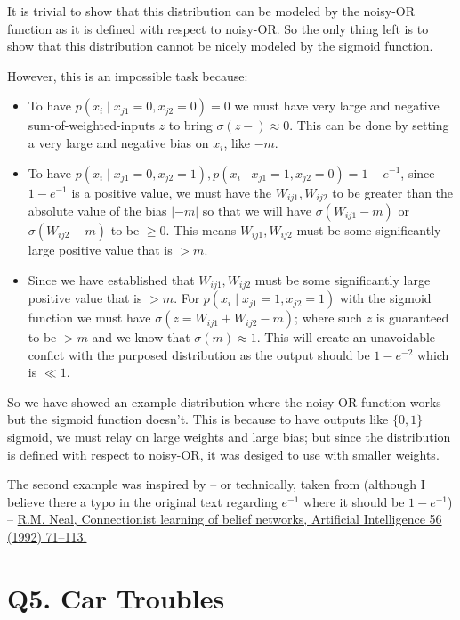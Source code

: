\documentclass[11pt]{article}
\begin{document}
It is trivial to show that this distribution can be modeled by the noisy-OR function as it is defined with respect to noisy-OR. So the only thing left is to show that this distribution cannot be nicely modeled by the sigmoid function.

However, this is an impossible task because:

\begin{itemize}
    \item To have $p(x_i  \mid x_{j1} = 0, x_{j2} = 0) = 0$ we must have very large and negative sum-of-weighted-inputs $z$ to bring $\sigma(z - \text{}) \approx 0$. This can be done by setting a very large and negative bias on $x_i$, like $-m$.
    \item To have $p(x_i \mid x_{j1} = 0, x_{j2} = 1), p(x_i  \mid x_{j1} = 1, x_{j2} = 0) = 1-e^{-1}$, since $1-e^{-1}$ is a positive value, we must have the $W_{ij1}, W_{ij2}$ to be greater than the absolute value of the bias $|-m|$ so that we will have $\sigma(W_{ij1} - m)$ or $\sigma(W_{ij2} - m)$ to be $\geq 0$. This means $W_{ij1}, W_{ij2}$ must be some significantly large positive value that is $> m$.
    \item Since we have established that $W_{ij1}, W_{ij2}$ must be some significantly large positive value that is $> m$. For $p(x_i \mid x_{j1} = 1, x_{j2} = 1)$ with the sigmoid function we must have $\sigma(z = W_{ij1} + W_{ij2} - m)$; where such $z$ is guaranteed to be $>m$ and we know that $\sigma(m) \approx 1$. This will create an unavoidable confict with the purposed distribution as the output should be $1-e^{-2}$ which is $\ll 1$.
\end{itemize}

So we have showed an example distribution where the noisy-OR function works but the sigmoid function doesn't. This is because to have outputs like $\{0, 1\}$ sigmoid, we must relay on large weights and large bias; but since the distribution is defined with respect to noisy-OR, it was desiged to use with smaller weights.\newline


\noindent The second example was inspired by -- or technically, taken from (although I believe there a typo in the original text regarding $e^{-1}$ where it should be $1 - e^{-1}$) -- \href{http://www.cs.toronto.edu/~bonner/courses/2016s/csc321/readings/Connectionist%20learning%20of%20belief%20networks.pdf}{R.M. Neal, Connectionist learning of belief networks, Artificial Intelligence 56 (1992) 71–113.}


\section*{Q5. Car Troubles}
\end{document}
